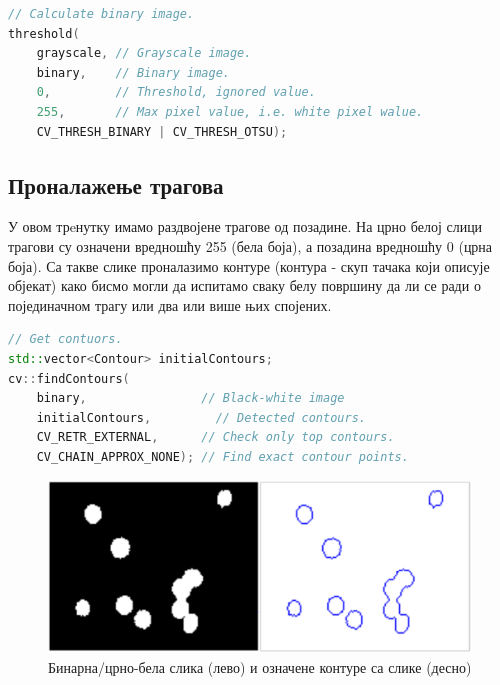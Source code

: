 \documentclass[12pt,a4paper,serbian,oneside]{book}
\begin{document}
 \begin{lstlisting}[language=C++,label=lst:grayscaleOtsu,caption=Рачунање бинарне слике са \textit{Otsu} прагом]
// Calculate binary image.
threshold(
    grayscale, // Grayscale image.
    binary,    // Binary image.
    0,         // Threshold, ignored value.
    255,       // Max pixel value, i.e. white pixel walue.
    CV_THRESH_BINARY | CV_THRESH_OTSU);
\end{lstlisting}

\subsection{Проналажење трагова}

У овом трeнутку имамо раздвојене трагове од позадине. На црно белој слици трагови су означени вредношћу 255 (бела боја), а позадина вредношћу 0 (црна боја). Са такве слике проналазимо контуре (контура - скуп тачака који описује објекат) како бисмо могли да испитамо сваку белу површину да ли се ради о појединачном трагу или два или више њих спојених. 

 \begin{lstlisting}[language=C++,label=lst:detectContours,caption=Детекција контура трагова]
// Get contuors.
std::vector<Contour> initialContours;
cv::findContours(
    binary,                // Black-white image
    initialContours,	     // Detected contours.
    CV_RETR_EXTERNAL,      // Check only top contours.
    CV_CHAIN_APPROX_NONE); // Find exact contour points.
\end{lstlisting}

\begin{figure}[htb]
\begin{center}
\leavevmode
\includegraphics[width=150mm]{images/seg_bin_con.png}
\end{center}
\caption{Бинарна/црно-бела слика (лево) и означене контуре са слике (десно)}
\label{fig:cv}
\end{figure}
\end{document}

